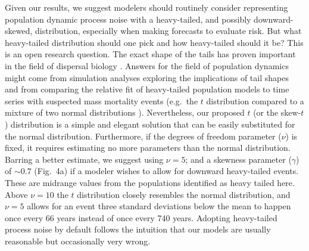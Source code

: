 \documentclass[9pt,twocolumn,twoside]{pnas-new}
\begin{document}


Given our results, we suggest modelers should routinely consider representing population dynamic
process noise with a heavy-tailed, and possibly downward-skewed, distribution,
especially when making forecasts to evaluate risk.
But what heavy-tailed distribution should one pick
and how heavy-tailed should it be?
This is an open research question.
The exact shape of the tails has proven important
in the field of dispersal biology \cite{kot1996, clark1999}.
Answers for the field of population dynamics
might come from simulation analyses exploring
the implications of tail shapes and
from comparing the relative fit of heavy-tailed
population models to time series
with suspected mass mortality events
(e.g.~the $t$ distribution compared to a mixture
of two normal distributions \cite{ward2007}).
Nevertheless, our proposed $t$ (or the skew-$t$) distribution
is a simple and elegant solution that
can be easily substituted for the normal distribution.
Furthermore, if the degrees of freedom parameter ($\nu$)
is fixed,
it requires estimating no more parameters
than the normal distribution.
Barring a better estimate,
we suggest using $\nu = 5$; and
a skewness parameter ($\gamma$) of $\sim 0.7$ (Fig.~4a)
if a modeler wishes to allow for downward heavy-tailed events.
These are midrange values from the populations identified as heavy tailed here.
Above $\nu  =  10$ the $t$ distribution closely resembles
the normal distribution,
and $\nu  = 5$ allows for an event
three standard deviations below the mean to happen
once every 66 years instead of once every 740 years.
Adopting heavy-tailed process noise by default follows the intuition
that our models are usually reasonable but occasionally very wrong.
\end{document}
